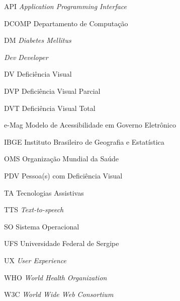 
\begin{siglas}
  	\item[API]{\textit{Application Programming Interface}}
  	\item[DCOMP]{Departamento de Computação}
  	\item[DM]{\textit{Diabetes Mellitus}}
  	\item[\emph{Dev}]{\textit{Developer}}
  	\item[DV]{Deficiência Visual}
  	\item[DVP]{Deficiência Visual Parcial}
  	\item[DVT]{Deficiência Visual Total}
  	\item[e-Mag]{Modelo de Acessibilidade em Governo Eletrônico}
  	\item[IBGE]{Instituto Brasileiro de Geografia e Estatística}
  	\item[OMS]{Organização Mundial da Saúde}
  	\item[PDV]{Pessoa(s) com Deficiência Visual}
  	\item[TA]{Tecnologias Assistivas}
  	\item[TTS]{\textit{Text-to-speech}}
  	\item[SO]{Sistema Operacional}
	\item[UFS]{Universidade Federal de Sergipe}
  	\item[UX]{\textit{User Experience}}
  	\item[WHO]{\textit{World Health Organization}}
  	\item[W3C]{\textit{World Wide Web Consortium}}
\end{siglas}
